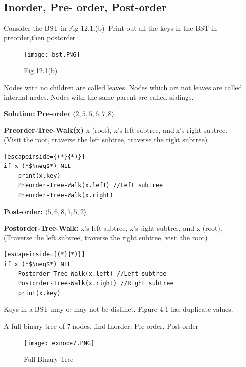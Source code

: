\documentclass[11pt,fleqn]{book}
\begin{document}
\subsection{Inorder, Pre- order, Post-order}
 \vspace{1em}
\begin{example}
 Consider the BST in Fig 12.1.(b).  Print out all the keys in the BST in preorder,then postorder
 \begin{figure}[h!]
     \centering
     \texttt{[image: bst.PNG]}
     \caption{Fig 12.1(b)}
     \label{fig:my_label}
 \end{figure}
\end{example}
\vspace{1em}
\begin{remark}
Nodes with no children are called leaves. Nodes which are not leaves are called internal nodes. Nodes with the same parent are called siblings. 
\end{remark}
\vspace{1em}
\textbf{Solution:} 
\textbf{Pre-order} $\langle 2,5,5,6,7,8\rangle$
\begin{definition}
\textbf{Preorder-Tree-Walk(x) } x (root), x's left subtree, and x's right subtree. \\
(Visit the root, traverse the left subtree, traverse the right subtree)
\begin{lstlisting}[escapeinside={(*}{*)}]
if x (*$\neq$*) NIL 
    print(x.key)
    Preorder-Tree-Walk(x.left) //Left subtree
    Preorder-Tree-Walk(x.right)
\end{lstlisting}
\end{definition}
\textbf{Post-order:} $\langle 5,6,8,7,5,2\rangle$
\begin{definition}
\textbf{Postorder-Tree-Walk: } x's left subtree, x's right subtree, and x (root).\\
(Traverse the left subtree, traverse the right subtree, visit the root)
\begin{lstlisting}[escapeinside={(*}{*)}]
if x (*$\neq$*) NIL
    Postorder-Tree-Walk(x.left) //Left subtree
    Postorder-Tree-Walk(x.right) //Right subtree
    print(x.key)
\end{lstlisting}
\end{definition}
\begin{remark}
Keys in a BST may or may not be distinct. Figure 4.1 has duplicate values. 
\end{remark}
\vspace{1em}
\begin{example}
A full binary tree of 7 nodes, find Inorder, Pre-order, Post-order 
\begin{figure}[h!]
    \centering
    \texttt{[image: exnode7.PNG]}
    \caption{Full Binary Tree}
    \label{fig:my_label}
\end{figure}
\end{example}
\end{document}
